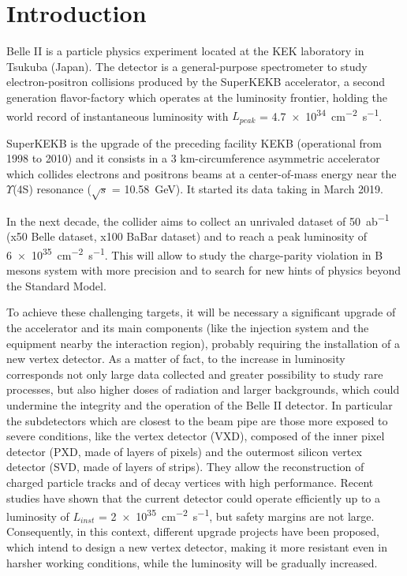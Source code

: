 

\chapter*{Introduction}

Belle II is a particle physics experiment located at the KEK laboratory in Tsukuba (Japan). The detector is a general-purpose spectrometer to study electron-positron collisions produced by the SuperKEKB accelerator, a second generation flavor-factory which operates at the luminosity frontier, holding the world record of instantaneous luminosity with $L_{peak}$ = \SI{4.7e34}{cm^{-2}.s^{-1}}.

SuperKEKB is the upgrade of the preceding facility KEKB (operational from 1998 to 2010) and it consists in a 3 km-circumference asymmetric accelerator which collides electrons and positrons beams at a center-of-mass energy near the $\Upsilon$(4S) resonance ($\sqrt{s}$ = \SI{10.58}{GeV}). It started its data taking in March 2019.

In the next decade, the collider aims to collect  an unrivaled dataset of \SI{50}{ab^{-1}} (x50 Belle dataset, x100 BaBar dataset) and to reach a peak luminosity of \SI{6e35}{cm^{-2}.s^{-1}}. This will allow to study the charge-parity violation in B mesons system with more precision and to search for new hints of physics beyond the Standard Model.

To achieve these challenging targets, it will be necessary a significant upgrade of the accelerator and its main components (like the injection system and the equipment nearby the interaction region), probably requiring the installation of a new vertex detector. As a matter of fact, to the increase in luminosity corresponds not only large data collected and greater possibility to study rare processes, but also higher doses of radiation and larger backgrounds, which could undermine the integrity and the operation of the Belle II detector.
In particular the subdetectors which are closest to the beam pipe are those more exposed to severe conditions, like the vertex detector (VXD), composed of the inner pixel detector (PXD, made of layers of pixels) and the outermost silicon vertex detector (SVD, made of layers of strips). They allow the reconstruction of charged particle tracks and of decay vertices with high performance. Recent studies have shown that the current detector could operate efficiently up to a luminosity of $L_{inst}$ = \SI{2e35}{cm^{-2}.s^{-1}}, but safety margins are not large. 
Consequently, in this context, different upgrade projects have been proposed, which intend to design a new vertex detector, making it more resistant even in harsher working conditions, while the luminosity will be gradually increased. 


